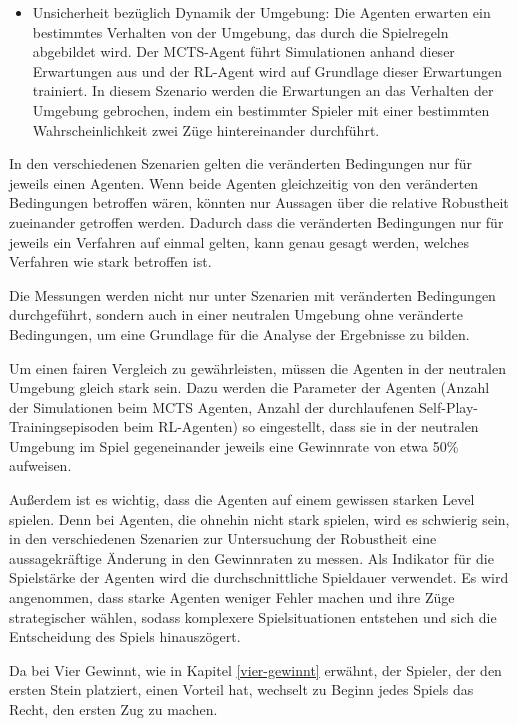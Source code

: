 \begin{itemize}
	\item Unsicherheit bezüglich Dynamik der Umgebung: Die Agenten erwarten ein bestimmtes Verhalten von der Umgebung, das durch die Spielregeln abgebildet wird. Der MCTS-Agent führt Simulationen anhand dieser Erwartungen aus und der RL-Agent wird auf Grundlage dieser Erwartungen trainiert. In diesem Szenario werden die Erwartungen an das Verhalten der Umgebung gebrochen, indem ein bestimmter Spieler mit einer bestimmten Wahrscheinlichkeit zwei Züge hintereinander durchführt.
	
\end{itemize}

In den verschiedenen Szenarien gelten die veränderten Bedingungen nur für jeweils einen Agenten. Wenn beide Agenten gleichzeitig von den veränderten Bedingungen betroffen wären, könnten nur Aussagen über die relative Robustheit zueinander getroffen werden. Dadurch dass die veränderten Bedingungen nur für jeweils ein Verfahren auf einmal gelten, kann genau gesagt werden, welches Verfahren wie stark betroffen ist.

Die Messungen werden nicht nur unter Szenarien mit veränderten Bedingungen durchgeführt, sondern auch in einer neutralen Umgebung ohne veränderte Bedingungen, um eine Grundlage für die Analyse der Ergebnisse zu bilden.

Um einen fairen Vergleich zu gewährleisten, müssen die Agenten in der neutralen Umgebung gleich stark sein. Dazu werden die Parameter der Agenten (Anzahl der Simulationen beim MCTS Agenten, Anzahl der durchlaufenen Self-Play-Trainingsepisoden beim RL-Agenten) so eingestellt, dass sie in der neutralen Umgebung im Spiel gegeneinander jeweils eine Gewinnrate von etwa 50\% aufweisen.

Außerdem ist es wichtig, dass die Agenten auf einem gewissen starken Level spielen. Denn bei Agenten, die ohnehin nicht stark spielen, wird es schwierig sein, in den verschiedenen Szenarien zur Untersuchung der Robustheit eine aussagekräftige Änderung in den Gewinnraten zu messen. Als Indikator für die Spielstärke der Agenten wird die durchschnittliche Spieldauer verwendet. Es wird angenommen, dass starke Agenten weniger Fehler machen und ihre Züge strategischer wählen, sodass komplexere Spielsituationen entstehen und sich die Entscheidung des Spiels hinauszögert.

Da bei Vier Gewinnt, wie in Kapitel \ref{vier-gewinnt} erwähnt, der Spieler, der den ersten Stein platziert, einen Vorteil hat, wechselt zu Beginn jedes Spiels das Recht, den ersten Zug zu machen.
